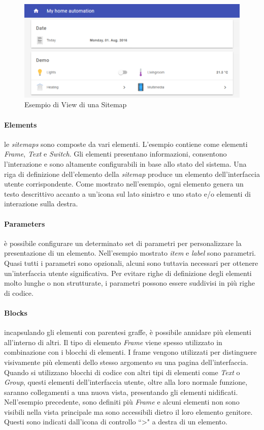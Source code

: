 \begin{figure}
    \centering
    \includegraphics[width=12cm]{Immagini/SitemapViewExample}
    \caption{Esempio di View di una Sitemap}
    \label{fig:sitemap_view_example}
\end{figure}

\paragraph{Elements} le {\em sitemaps} sono composte da vari elementi. L'esempio contiene come elementi {\em Frame}, {\em Text} e {\em Switch}. Gli elementi presentano informazioni, consentono l'interazione e sono altamente configurabili in base allo stato del sistema. Una riga di definizione dell'elemento della {\em sitemap} produce un elemento dell'interfaccia utente corrispondente. Come mostrato nell'esempio, ogni elemento genera un testo descrittivo accanto a un'icona sul lato sinistro e uno stato e/o elementi di interazione sulla destra.

\paragraph{Parameters} è possibile configurare un determinato set di parametri per personalizzare la presentazione di un elemento. Nell'esempio mostrato {\em item} e {\em label} sono parametri. Quasi tutti i parametri sono opzionali, alcuni sono tuttavia necessari per ottenere un'interfaccia utente significativa. Per evitare righe di definizione degli elementi molto lunghe o non strutturate, i parametri possono essere suddivisi in più righe di codice.

\paragraph{Blocks} incapsulando gli elementi con parentesi graffe, è possibile annidare più elementi all'interno di altri. Il tipo di elemento {\em Frame} viene spesso utilizzato in combinazione con i blocchi di elementi. I frame vengono utilizzati per distinguere visivamente più elementi dello stesso argomento su una pagina dell'interfaccia. Quando si utilizzano blocchi di codice con altri tipi di elementi come {\em Text} o {\em Group}, questi elementi dell'interfaccia utente, oltre alla loro normale funzione, saranno collegamenti a una nuova vista, presentando gli elementi nidificati. Nell'esempio precedente, sono definiti più {\em Frame} e alcuni elementi non sono visibili nella vista principale ma sono accessibili dietro il loro elemento genitore. Questi sono indicati dall'icona di controllo ``\textgreater" a destra di un elemento.

